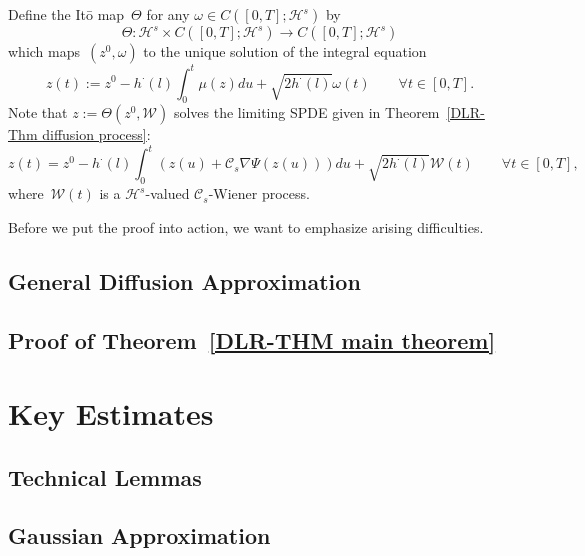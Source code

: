 Define the It\={o} map~$\Theta$ for any $\omega \in C([0,T];\mathcal{H}^s)$ by 
\begin{equation*}
 \Theta : \mathcal{H}^s \times C([0,T];\mathcal{H}^s) \to C([0,T];\mathcal{H}^s)
\end{equation*}
which maps~$(z^0, \omega)$ to the unique solution of the integral equation
\begin{equation}
  z(t) := z^0 - h^{\cdot}(l) \int_0^t \mu(z) du + \sqrt{2 h^{\cdot}(l)} \omega(t) \qquad \forall t \in [0,T].
\end{equation}
Note that $z := \Theta (z^0, \mathcal{W})$ solves the limiting SPDE given in Theorem~\ref{DLR-Thm diffusion process}:
\begin{equation}
 z(t) = z^0 -  h^{\cdot}(l) \int_0^t (z(u) + \mathcal{C}_s \nabla \Psi(z(u))) du + \sqrt{2 h^{\cdot}(l)} \mathcal{W}(t) \qquad \forall t \in [0,T],
\end{equation}
where~$\mathcal{W}(t)$ is a $ \mathcal{H}^s $-valued  $ \mathcal{C}_s $-Wiener process.













Before we put the proof into action, we want to emphasize arising difficulties.



\subsection{General Diffusion Approximation}
\label{sec:sub:DLR-General diffusion approximation}

\subsection{Proof of Theorem~\ref{DLR-THM main theorem}}
\label{sec:sub:DLR-Proof}

\section{Key Estimates}
\label{sec:DLR-Estimates}

\subsection{Technical Lemmas}

\subsection{Gaussian Approximation}

